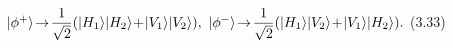 \hsize=11cm
\parindent=0pt
\nopagenumbers
$ |\phi^+\rangle\!\to\!{\displaystyle{1\over{\sqrt{2}}}}(|H_1\rangle|H_2\rangle
\!+\!|V_1\rangle|V_2\rangle), \
|\phi^-\rangle\!\to\!{\displaystyle{1\over{\sqrt{2}}}}(|H_1\rangle|V_2\rangle
\!+\!|V_1\rangle|H_2\rangle).$ \hfill (3.33)

\bye
